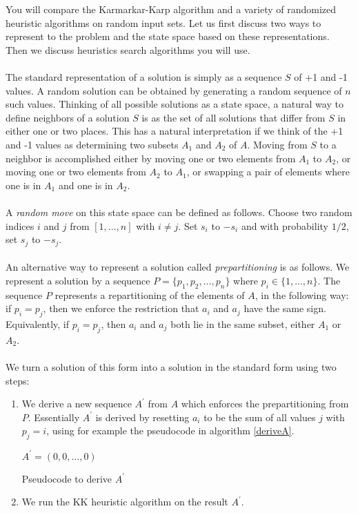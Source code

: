 \documentclass[tikz, 12pt]{scrartcl}
\begin{document}
You will compare the Karmarkar-Karp algorithm and a variety of randomized heuristic algorithms on random input sets. Let us first discuss two ways to represent to the problem and the state space based on these representations. Then we discuss heuristics search algorithms you will use.\\
\\
The standard representation of a solution is simply as a sequence $S$ of +1 and -1 values. A random solution can be obtained by generating a random sequence  of $n$ such values. Thinking of all possible solutions as a state space, a natural way to define neighbors of a solution $S$ is as the set of all solutions that differ from $S$ in either one or two places. This has a natural interpretation if we think of the +1 and -1 values as determining two subsets $A_1$ and $A_2$ of $A$. Moving from $S$ to a neighbor is accomplished either by moving one or two elements from $A_1$ to $A_2$, or moving one or two elements from $A_2$ to $A_1$, or swapping a pair of elements where one is in $A_1$ and one is in $A_2$.\\
\\
A \textit{random move} on this state space can be defined as follows. Choose two random indices $i$ and $j$ from $[1, \ldots, n]$ with $i \neq j$. Set $s_i$ to $-s_i$ and with probability $1/2$, set $s_j$ to $-s_j$.\\
\\
An alternative way to represent a solution called \textit{prepartitioning} is as follows. We represent a solution by a sequence $P = \{p_1, p_2, \ldots, p_n \}$ where $p_i \in \{1, \ldots, n \}$. The sequence $P$ represents a repartitioning of the elements of $A$, in the following way: if $p_i = p_j$, then we enforce the restriction that $a_i$ and $a_j$ have the same sign. Equivalently, if $p_i = p_j$, then $a_i$ and $a_j$ both lie in the same subset, either $A_1$ or $A_2$. \\
\\
We turn a solution of this form into a solution in the standard form using two steps:
\begin{enumerate}
	\item We derive a new sequence $A^{\prime}$ from $A$ which enforces the prepartitioning from $P$. Essentially $A^{\prime}$ is derived by resetting $a_i$ to be the sum of all values $j$ with $p_j = i$, using for example the  pseudocode in algorithm \ref{deriveA}.

\begin{algorithm}[th!]
	$A^{\prime} = (0, 0, \ldots, 0)$\\
\caption{Pseudocode to derive $A^{\prime}$}
\label{deriveA}
\end{algorithm}	
	\item We run the KK heuristic algorithm on the result $A^{\prime}$.
\end{enumerate}
\end{document}
